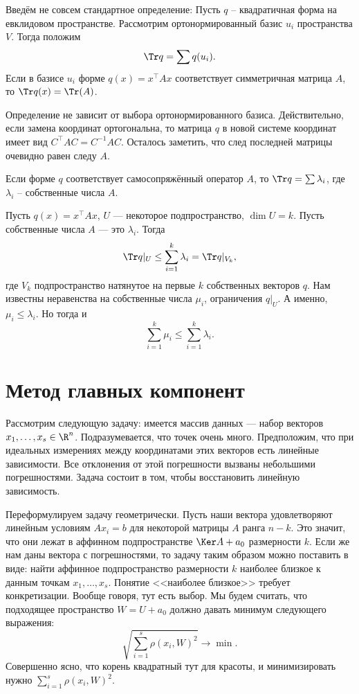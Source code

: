 Введём не совсем стандартное определение:
\dfn
Пусть $q$ -- квадратичная форма на евклидовом пространстве. Рассмотрим ортонормированный базис $u_i$ пространства $V$. Тогда положим 
$$\Tr q= \sum q(u_i).$$ Если в базисе $u_i$ форме $q(x)=x^{\top} Ax $ соответствует симметричная матрица $A$, то $\Tr q(x)=\Tr(A)$.
\edfn

\rm Определение не зависит от выбора ортонормированного базиса. Действительно, если замена координат ортогональна, то матрица $q$ в новой системе координат имеет вид $C^{\top}AC=C^{-1}AC$. Осталось заметить, что след последней матрицы очевидно равен следу $A$.
\erm

\rm Если форме $q$ соответствует самосопряжённый оператор $A$, то $\Tr q=\sum \lambda_i$, где $\lambda_i$ -- собственные числа $A$.
\erm




\crl Пусть $q(x)=x^{\top} Ax$, $U$ --- некоторое подпространство, $\dim U=k$. Пусть собственные числа $A$ --- это $\lambda_i$. Тогда $$\Tr q|_U\leq \sum_{i=1}^k \lambda_i= \Tr q|_{V_k},$$
где $V_k$ подпространство натянутое на первые $k$ собственных векторов $q$.
\proof Нам известны неравенства на собственные числа $\mu_i$, ограничения $q|_U$. А именно, $\mu_i\leq \lambda_i$. Но тогда и $$\sum_{i=1}^k \mu_i \leq \sum_{i=1}^k \lambda_i.$$
\endproof
\ecrl 






\section{Метод главных компонент}

Рассмотрим следующую задачу: имеется массив данных --- набор векторов $x_1,\dots,x_s \in \R^n$. Подразумевается, что точек очень много. Предположим, что при идеальных измерениях между координатами этих векторов есть линейные зависимости. Все отклонения от этой погрешности вызваны небольшими погрешностями. Задача состоит в том, чтобы восстановить линейную зависимость. 


Переформулируем задачу геометрически. Пусть наши вектора удовлетворяют линейным условиям $Ax_i=b$ для некоторой матрицы $A$ ранга $n-k$. Это значит, что они лежат в аффинном подпространстве $\Ker A + a_0$ размерности $k$. Если же нам даны вектора с погрешностями, то задачу таким образом можно поставить в виде: найти аффинное подпространство размерности $k$ наиболее близкое к данным точкам $x_1,\dots,x_s$. Понятие <<наиболее близкое>> требует конкретизации. Вообще говоря, тут есть выбор. Мы будем считать, что подходящее пространство $W=U+a_0$ должно давать минимум следующего выражения:
$$\sqrt{\sum_{i=1}^s \rho(x_i,W)^2} \to \min.$$
Совершенно ясно, что корень квадратный тут для красоты, и минимизировать нужно $\sum_{i=1}^s \rho(x_i,W)^2$.


